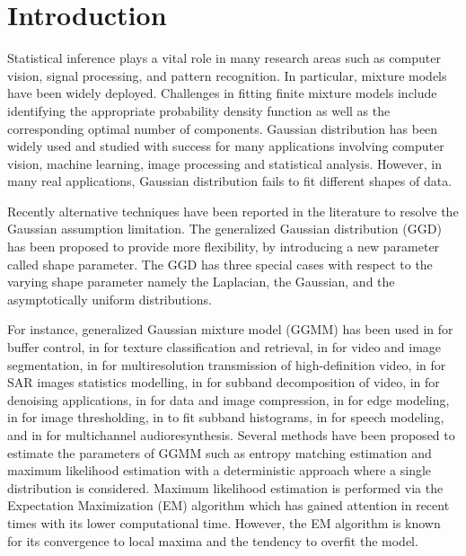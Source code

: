 \documentclass[conference]{IEEEtran}
\begin{document}

\section{Introduction}
Statistical inference plays a vital role in many research areas such as computer vision, signal processing, and pattern recognition. In particular, mixture models have been widely deployed. Challenges in fitting finite mixture models include identifying the appropriate probability density function as well as the corresponding optimal number of components. 
Gaussian distribution has been widely used and studied with success for many applications involving computer vision, machine learning, image processing and statistical analysis.
However, in many real applications, Gaussian distribution fails to fit different shapes of data\cite{b5}.

Recently alternative techniques have been reported in the literature to resolve the Gaussian assumption limitation. 
The generalized Gaussian distribution (GGD) has been proposed
to provide more flexibility, by introducing a new parameter called shape parameter.  
The GGD has three special cases with respect to the varying shape parameter namely the Laplacian, the Gaussian, and the asymptotically uniform distributions. 

For instance, generalized Gaussian mixture model (GGMM) has been used in \cite{n15} for buffer control, in \cite{n16, n17, n18} for texture classification and retrieval, in \cite{n27, n28, n29} for video and image segmentation, in \cite{n13} for multiresolution transmission of high-definition video, in \cite{n30} for SAR images statistics modelling, in \cite{n14} for subband decomposition of video,   in \cite{n19} for denoising applications, in \cite{n20, n21} for data and image compression, in \cite{n22} for edge modeling, in \cite{n23, n24} for image thresholding, in \cite{n12, n4} to fit subband histograms, in \cite{n25, n26} for speech modeling,  and in \cite{n31} for multichannel audioresynthesis.
Several methods have been proposed to estimate the parameters of GGMM such as entropy matching estimation \cite{n34, n26} and maximum likelihood estimation \cite{n32, n16, n35, n36, n10} with a deterministic approach where a single distribution is considered. 
Maximum likelihood estimation is performed via the Expectation Maximization (EM) algorithm which has gained attention in recent times with its lower computational time. However, the EM algorithm is known for its convergence to local maxima and the tendency to overfit the model.
\end{document}
